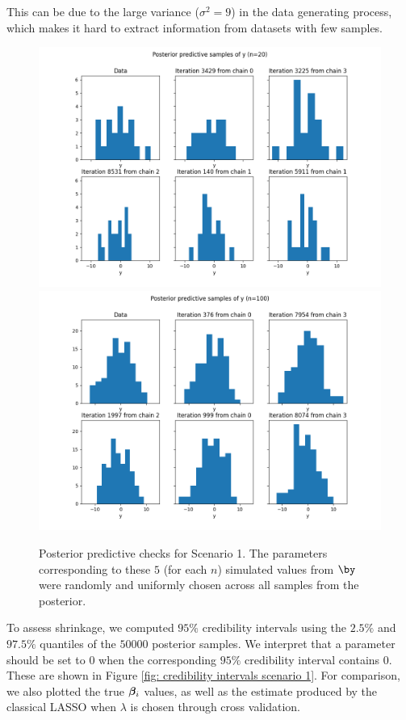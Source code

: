 \documentclass[a4paper, 10pt]{article}
\begin{document}
This can be due to the large variance ($ \sigma^2 = 9 $) in the data generating process, which makes it hard to extract information from datasets with few samples.
\begin{figure}[htb]
    \begin{center}
        \includegraphics[height=.5\textwidth]{../outputs/artificial_scenarios_n=20/scenario_1/posterior_predictive_check.png}
        \includegraphics[height=.5\textwidth]{../outputs/artificial_scenarios_n=100/scenario_1/posterior_predictive_check.png}
    \end{center}
    \caption[Posterior predictive checks for Scenario 1.]{Posterior predictive checks for Scenario 1. The parameters corresponding to these $ 5$ (for each $ n $) simulated values from $ \by $ were randomly and uniformly chosen across all samples from the posterior.}
    \label{fig: posterior predictive check scenario 1}
\end{figure}

To assess shrinkage, we computed $ 95\% $ credibility intervals using the $ 2.5\% $ and $ 97.5\% $ quantiles of the $ 50 000 $ posterior samples.
We interpret that a parameter should be set to $ 0 $ when the corresponding $ 95\% $ credibility interval contains $ 0 $.
These are shown in Figure \ref{fig: credibility intervals scenario 1}.
For comparison, we also plotted the true $ \boldsymbol{\beta}_{ i } $ values, as well as the estimate produced by the classical LASSO when $ \lambda $ is chosen through cross validation.
\end{document}
